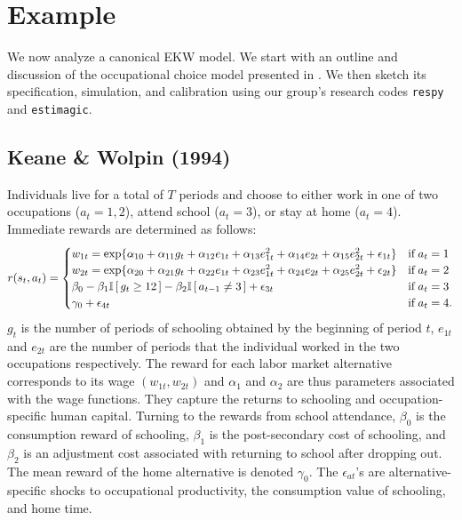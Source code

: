 \section{Example}\label{Example}
We now analyze a canonical EKW model. We start with an outline and discussion of the occupational choice model presented in \citet{Keane.1994}. We then sketch its specification, simulation, and calibration using our group's research codes \verb+respy+ and \verb+estimagic+.
\subsection{Keane \& Wolpin (1994)}
Individuals live for a total of $T$ periods and choose to either work in one of two occupations ($a_t = 1, 2$), attend school ($a_t = 3$), or stay at home ($a_t = 4$). Immediate rewards are determined as follows:
%
\begin{align*}
r(s_t, a_t) = \begin{cases} w_{1t} =
\exp\{\alpha_{10} + \alpha_{11}g_t + \alpha_{12}e_{1t} + \alpha_{13}e^2_{1t} + \alpha_{14}e_{2t} + \alpha_{15}e^2_{2t} + \epsilon_{1t}\} & \text{if}\; a_t = 1 \\
w_{2t} = \exp\{\alpha_{20} + \alpha_{21}g_t + \alpha_{22}e_{1t} + \alpha_{23}e^2_{1t} + \alpha_{24}e_{2t} + \alpha_{25}e^2_{2t} + \epsilon_{2t}\}& \text{if}\; a_t = 2 \\
\beta_0 - \beta_1 \mathbb{I}\,[\,g_t \geq 12\,] - \beta_2\mathbb{I}\,[\,a_{t - 1} \neq 3\,] + \epsilon_{3t}& \text{if}\; a_t = 3 \\
\gamma_0 + \epsilon_{4t}& \text{if}\; a_t = 4. \\
\end{cases}
\end{align*}
%
$g_t$ is the number of periods of schooling obtained by the beginning of period $t$, $e_{1t}$ and $e_{2t}$ are the number of periods that the individual worked in the two occupations respectively. The reward for each labor market alternative corresponds to its wage $(w_{1t}, w_{2t})$ and $\alpha_{1}$ and $\alpha_{2}$ are thus parameters associated with the wage functions. They capture the returns to schooling and occupation-specific human capital. Turning to the rewards from school attendance, $\beta_0$ is the consumption reward of schooling, $\beta_1$ is the post-secondary cost of schooling, and $\beta_2$ is an adjustment cost associated with returning to school after dropping out. The mean reward of the home alternative is denoted $\gamma_0$. The $\epsilon_{at}$'s are alternative-specific shocks to occupational productivity, the consumption value of schooling, and home time.\\

